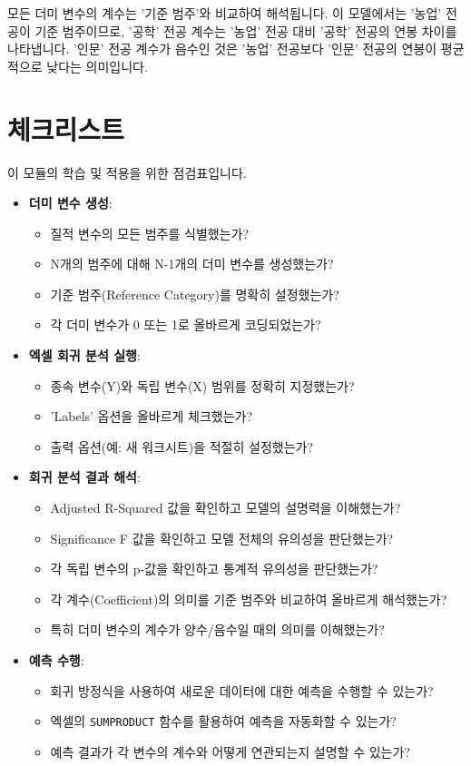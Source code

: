 \documentclass[11pt,a4paper]{article}
\theoremstyle{definition}
\begin{document}
\begin{tcolorbox}[warning={중요: 기준 범주와의 비교}]
모든 더미 변수의 계수는 '기준 범주'와 비교하여 해석됩니다. 이 모델에서는 '농업' 전공이 기준 범주이므로, '공학' 전공 계수는 '농업' 전공 대비 '공학' 전공의 연봉 차이를 나타냅니다. '인문' 전공 계수가 음수인 것은 '농업' 전공보다 '인문' 전공의 연봉이 평균적으로 낮다는 의미입니다.
\end{tcolorbox}

\newpage
\section{체크리스트}

이 모듈의 학습 및 적용을 위한 점검표입니다.

\begin{itemize}
    \item \textbf{더미 변수 생성}:
    \begin{itemize}
        \item 질적 변수의 모든 범주를 식별했는가?
        \item N개의 범주에 대해 N-1개의 더미 변수를 생성했는가?
        \item 기준 범주(Reference Category)를 명확히 설정했는가?
        \item 각 더미 변수가 0 또는 1로 올바르게 코딩되었는가?
    \end{itemize}
    \item \textbf{엑셀 회귀 분석 실행}:
    \begin{itemize}
        \item 종속 변수(Y)와 독립 변수(X) 범위를 정확히 지정했는가?
        \item 'Labels' 옵션을 올바르게 체크했는가?
        \item 출력 옵션(예: 새 워크시트)을 적절히 설정했는가?
    \end{itemize}
    \item \textbf{회귀 분석 결과 해석}:
    \begin{itemize}
        \item Adjusted R-Squared 값을 확인하고 모델의 설명력을 이해했는가?
        \item Significance F 값을 확인하고 모델 전체의 유의성을 판단했는가?
        \item 각 독립 변수의 p-값을 확인하고 통계적 유의성을 판단했는가?
        \item 각 계수(Coefficient)의 의미를 기준 범주와 비교하여 올바르게 해석했는가?
        \item 특히 더미 변수의 계수가 양수/음수일 때의 의미를 이해했는가?
    \end{itemize}
    \item \textbf{예측 수행}:
    \begin{itemize}
        \item 회귀 방정식을 사용하여 새로운 데이터에 대한 예측을 수행할 수 있는가?
        \item 엑셀의 \texttt{SUMPRODUCT} 함수를 활용하여 예측을 자동화할 수 있는가?
        \item 예측 결과가 각 변수의 계수와 어떻게 연관되는지 설명할 수 있는가?
    \end{itemize}
\end{itemize}
\end{document}
